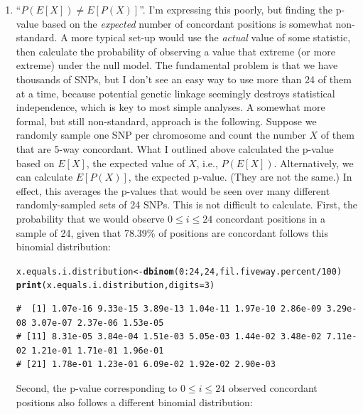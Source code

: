 \documentclass{article}\usepackage[]{graphicx}\usepackage[]{color}
\makeatletter
\newcommand{\hlnum}[1]{\textcolor[rgb]{0.686,0.059,0.569}{#1}}%
\newcommand{\hlopt}[1]{\textcolor[rgb]{0,0,0}{#1}}%
\newcommand{\hlstd}[1]{\textcolor[rgb]{0.345,0.345,0.345}{#1}}%
\newcommand{\hlkwb}[1]{\textcolor[rgb]{0.69,0.353,0.396}{#1}}%
\newcommand{\hlkwc}[1]{\textcolor[rgb]{0.333,0.667,0.333}{#1}}%
\newcommand{\hlkwd}[1]{\textcolor[rgb]{0.737,0.353,0.396}{\textbf{#1}}}%
\newenvironment{kframe}{%
 \def\at@end@of@kframe{}%
 \ifinner\ifhmode%
  \def\at@end@of@kframe{\end{minipage}}%
  \begin{minipage}{\columnwidth}%
 \fi\fi%
 \def\FrameCommand##1{\hskip\@totalleftmargin \hskip-\fboxsep
 \colorbox{shadecolor}{##1}\hskip-\fboxsep
     \hskip-\linewidth \hskip-\@totalleftmargin \hskip\columnwidth}%
 \MakeFramed {\advance\hsize-\width
   \@totalleftmargin\z@ \linewidth\hsize
   \@setminipage}}%
 {\par\unskip\endMakeFramed%
 \at@end@of@kframe}
\newenvironment{knitrout}{}{} %
\makeatother
\begin{document}
\begin{enumerate}
  \item ``$P(E[X]) \neq E[P(X)]$''.  I'm expressing this poorly, but finding the p-value based on the \emph{expected} number of concordant positions is somewhat non-standard.  A more typical set-up would use the \emph{actual} value of some statistic, then calculate the probability of observing a value that extreme (or more extreme) under the null model.  The fundamental problem is that we have thousands of SNPs, but I don't see an easy way to use more than 24 of them at a time, because potential genetic linkage seemingly destroys statistical independence, which is key to most simple analyses.  
A somewhat more formal, but still non-standard, approach is the following.  Suppose we randomly sample one SNP per chromosome and count the number $X$ of them that are 5-way concordant.  What I outlined above calculated the p-value based on $E[X]$, the expected value of $X$, i.e., $P(E[X])$.  Alternatively, we can calculate $E[P(X)]$, the expected p-value.  (They are not the same.)  In effect, this averages the p-values that would be seen over many different randomly-sampled sets of 24 SNPs.  This is not difficult to calculate.  First, the probability that we would observe $0 \leq i \leq 24$ concordant positions in a sample of 24, given that 78.39\% of positions are concordant follows this binomial distribution:

\begin{knitrout}\footnotesize
{}\color{fgcolor}\begin{kframe}
\begin{alltt}
\hlstd{x.equals.i.distribution} \hlkwb{<-} \hlkwd{dbinom}\hlstd{(}\hlnum{0}\hlopt{:}\hlnum{24}\hlstd{,} \hlnum{24}\hlstd{, fil.fiveway.percent}\hlopt{/}\hlnum{100}\hlstd{)}
\hlkwd{print}\hlstd{(x.equals.i.distribution,} \hlkwc{digits}\hlstd{=}\hlnum{3}\hlstd{)}
\end{alltt}
\begin{verbatim}
#  [1] 1.07e-16 9.33e-15 3.89e-13 1.04e-11 1.97e-10 2.86e-09 3.29e-08 3.07e-07 2.37e-06 1.53e-05
# [11] 8.31e-05 3.84e-04 1.51e-03 5.05e-03 1.44e-02 3.48e-02 7.11e-02 1.21e-01 1.71e-01 1.96e-01
# [21] 1.78e-01 1.23e-01 6.09e-02 1.92e-02 2.90e-03
\end{verbatim}
\end{kframe}
\end{knitrout}

Second, the p-value corresponding to $0 \leq i \leq 24$ observed concordant positions also follows a different binomial distribution:


\end{enumerate}
\end{document}
